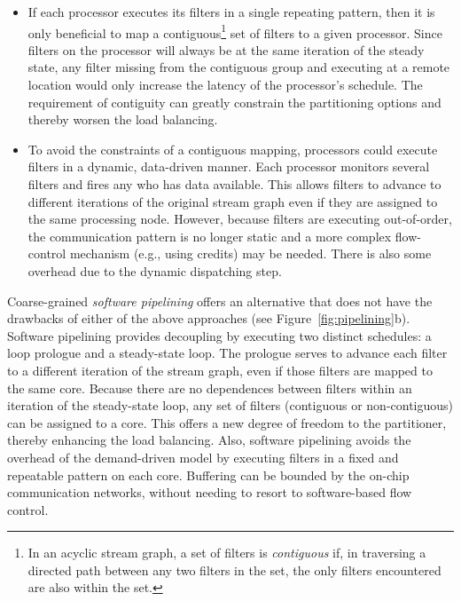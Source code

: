 \begin{itemize}

\item If each processor executes its filters in a single repeating
pattern, then it is only beneficial to map a contiguous\footnote{In an
acyclic stream graph, a set of filters is {\it contiguous} if, in
traversing a directed path between any two filters in the set, the
only filters encountered are also within the set.} set of filters to a
given processor.  Since filters on the processor will always be at the
same iteration of the steady state, any filter missing from the
contiguous group and executing at a remote location would only
increase the latency of the processor's schedule.  The requirement of
contiguity can greatly constrain the partitioning options and thereby
worsen the load balancing.

\item To avoid the constraints of a contiguous mapping, processors
could execute filters in a dynamic, data-driven manner.  Each
processor monitors several filters and fires any who has data
available.  This allows filters to advance to different iterations of
the original stream graph even if they are assigned to the same
processing node.  However, because filters are executing out-of-order,
the communication pattern is no longer static and a more complex
flow-control mechanism (e.g., using credits) may be needed.  There is
also some overhead due to the dynamic dispatching step.

\end{itemize}

Coarse-grained {\it software pipelining} offers an alternative that
does not have the drawbacks of either of the above approaches (see
Figure~\ref{fig:pipelining}b).  Software pipelining provides
decoupling by executing two distinct schedules: a loop prologue and a
steady-state loop.  The prologue serves to advance each filter to a
different iteration of the stream graph, even if those filters are
mapped to the same core.  Because there are no dependences between
filters within an iteration of the steady-state loop, any set of
filters (contiguous or non-contiguous) can be assigned to a core.
This offers a new degree of freedom to the partitioner, thereby
enhancing the load balancing.  Also, software pipelining avoids the
overhead of the demand-driven model by executing filters in a fixed
and repeatable pattern on each core.  Buffering can be bounded by the
on-chip communication networks, without needing to resort to
software-based flow control.

